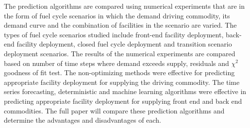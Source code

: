 \documentclass{anstrans}
\begin{document}
The prediction algorithms are compared using numerical experiments that are 
in the form of fuel cycle scenarios in which the
demand driving commodity, its demand curve and the combination of facilities 
in the scenario are varied. 
The types of fuel cycle scenarios studied include front-end facility deployment, 
back-end facility deployment, closed fuel cycle deployment and transition 
scenario deployment scenarios.
The results of the numerical experiments are compared based on number of time
steps where demand exceeds supply, residuals and $\chi^2$ goodness of fit test.
The non-optimizing methods were effective for predicting 
appropriate facility deployment for supplying the driving commodity.
The time series forecasting, deterministic and machine learning 
algorithms were effective in predicting appropriate facility deployment for 
supplying front end and back end commodities. The full paper will compare 
these prediction algorithms and determine the advantages and disadvantages of
each.  



\end{document}
